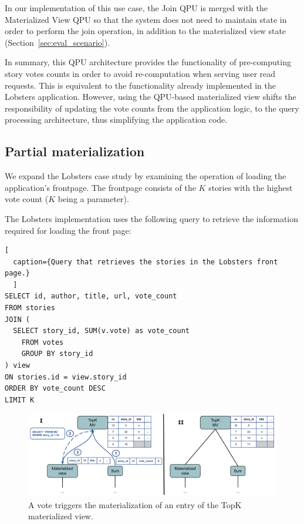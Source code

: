 In our implementation of this use case,
the Join QPU is merged with the Materialized View QPU so that the system does not need to maintain state
in order to perform the join operation, in addition to the materialized view state (Section~\ref{sec:eval_scenario}).

\medskip
\noindent
In summary,
this QPU architecture provides the functionality of pre-computing story votes counts in order to avoid re-computation
when serving user read requests.
This is equivalent to the functionality already implemented in the Lobsters application.
However, using the QPU-based materialized view shifts the responsibility of updating the vote counts from the application logic,
to the query processing architecture, thus simplifying the application code.


\subsection{Partial materialization}

We expand the Lobsters case study by examining the operation of loading the application's frontpage.
The frontpage consists of the $K$ stories with the highest vote count ($K$ being a parameter).

The Lobsters implementation uses the following query to retrieve the information required for loading the front page:

\begin{lstlisting}[
  caption={Query that retrieves the stories in the Lobsters front page.}
  ]
SELECT id, author, title, url, vote_count
FROM stories
JOIN (
  SELECT story_id, SUM(v.vote) as vote_count
	FROM votes
	GROUP BY story_id
) view
ON stories.id = view.story_id
ORDER BY vote_count DESC
LIMIT K
\end{lstlisting}

\begin{figure}[t]
  \centering
    \includegraphics[scale=0.4]{./figures/case_studies/lobsters_architecture_materialization.pdf}
  \caption{A vote triggers the materialization of an entry of the TopK materialized view.}
  \label{fig:lobsters_architecture_materialization}
\end{figure}

